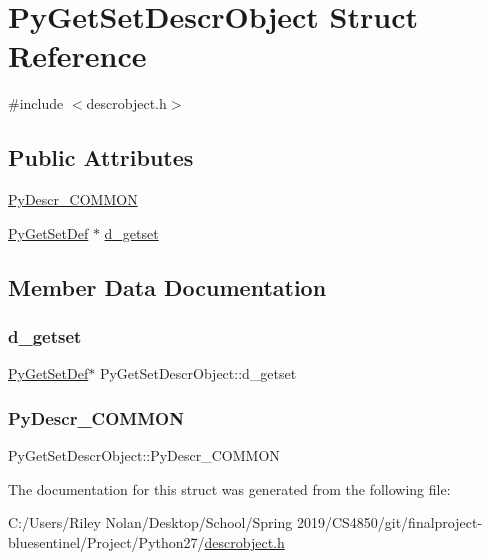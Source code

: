 \hypertarget{struct_py_get_set_descr_object}{}\section{Py\+Get\+Set\+Descr\+Object Struct Reference}
\label{struct_py_get_set_descr_object}


{\ttfamily \#include $<$descrobject.\+h$>$}

\subsection*{Public Attributes}
\begin{DoxyCompactItemize}
\item 
\mbox{\hyperlink{struct_py_get_set_descr_object_ae3a0a2d48ea91c279a98fd81f7a16e53}{Py\+Descr\+\_\+\+C\+O\+M\+M\+ON}}
\item 
\mbox{\hyperlink{struct_py_get_set_def}{Py\+Get\+Set\+Def}} $\ast$ \mbox{\hyperlink{struct_py_get_set_descr_object_a5fea3428311519839767a9c26edddb70}{d\+\_\+getset}}
\end{DoxyCompactItemize}


\subsection{Member Data Documentation}
\mbox{\label{struct_py_get_set_descr_object_a5fea3428311519839767a9c26edddb70}} 
\subsubsection{\texorpdfstring{d\_getset}{d\_getset}}
{\footnotesize\ttfamily \mbox{\hyperlink{struct_py_get_set_def}{Py\+Get\+Set\+Def}}$\ast$ Py\+Get\+Set\+Descr\+Object\+::d\+\_\+getset}

\mbox{\label{struct_py_get_set_descr_object_ae3a0a2d48ea91c279a98fd81f7a16e53}} 
\subsubsection{\texorpdfstring{PyDescr\_COMMON}{PyDescr\_COMMON}}
{\footnotesize\ttfamily Py\+Get\+Set\+Descr\+Object\+::\+Py\+Descr\+\_\+\+C\+O\+M\+M\+ON}



The documentation for this struct was generated from the following file\+:\begin{DoxyCompactItemize}
\item 
C\+:/\+Users/\+Riley Nolan/\+Desktop/\+School/\+Spring 2019/\+C\+S4850/git/finalproject-\/bluesentinel/\+Project/\+Python27/\mbox{\hyperlink{descrobject_8h}{descrobject.\+h}}\end{DoxyCompactItemize}
